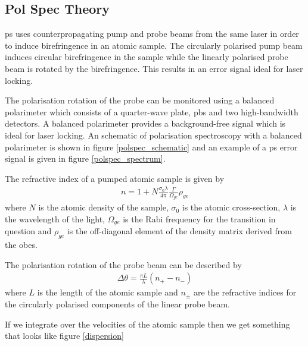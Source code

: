 \documentclass{article}
\begin{document}
\begin{multicols}{2}
\section{Pol Spec Theory}

\Gls{ps} uses counterpropagating pump and probe beams from the same laser in order to induce birefringence in an atomic sample. The circularly polarised pump beam induces circular birefringence in the sample while the linearly polarised probe beam is rotated by the birefringence\cite{wieman_doppler-free_1976, demtroder_laser_2014}. This results in an error signal ideal for laser locking.

The polarisation rotation of the probe can be monitored using a balanced polarimeter which consists of a quarter-wave plate, \gls{pbs} and two high-bandwidth detectors. A balanced polarimeter provides a background-free signal which is ideal for laser locking\cite{pearman_polarization_2002}. An schematic of polarisation spectroscopy with a balanced polarimeter is shown in figure \ref{polspec_schematic} and an example of a \gls{ps} error signal is given in figure \ref{polspec_spectrum}.

The refractive index of a pumped atomic sample is given by\cite{sheludko_shaped_2010}
\begin{align}
n=1+N\frac{\sigma_0\lambda}{4\pi}\frac{\Gamma}{\Omega_{ge}}\rho_{ge}
\end{align}
where $N$ is the atomic density of the sample, $\sigma_0$ is the atomic cross-section, $\lambda$ is the wavelength of the light, $\Omega_{ge}$ is the Rabi frequency for the transition in question and $\rho_{ge}$ is the off-diagonal element of the density matrix derived from the \glspl{obe}.

The polarisation rotation of the probe beam can be described by\cite{hecht_optics_1987}
\begin{align}
\Delta\theta=\frac{\pi L}{\lambda}(n_+-n_-)
\end{align}
where $L$ is the length of the atomic sample and $n_\pm$ are the refractive indices for the circularly polarised components of the linear probe beam.

If we integrate over the velocities of the atomic sample {\color{red}then we get something that looks like figure \ref{dispersion}}


\end{multicols}
\end{document}
